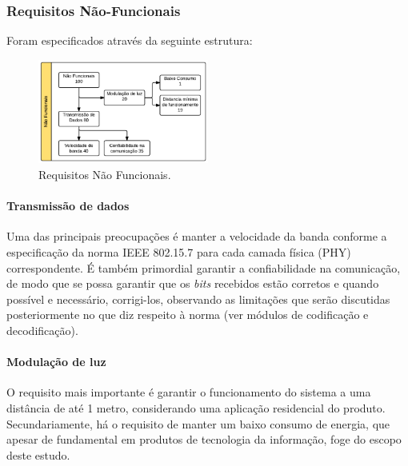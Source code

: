 	
	\subsubsection{Requisitos Não-Funcionais}\label{subsubsec-requisitos-nfunc}
	
	Foram especificados através da seguinte estrutura:
	
	\begin{figure}[h!]
		\caption{\label{fig_req2}Requisitos Não Funcionais.}
		\centering
		\includegraphics[width=0.5\textwidth]{Req_Tree_NFunc.pdf}
	\end{figure}

	\paragraph{Transmissão de dados} 
	Uma das principais preocupações é manter a velocidade da banda conforme a especificação da norma IEEE 802.15.7 para cada camada física (PHY) correspondente. É também primordial garantir a confiabilidade na comunicação, de modo que se possa garantir que os \textit{bits} recebidos estão corretos e quando possível e necessário, corrigi-los, observando as limitações que serão discutidas posteriormente no que diz respeito à norma (ver módulos de codificação e decodificação). 
	
	\paragraph{Modulação de luz} 
	O requisito mais importante é garantir o funcionamento do sistema a uma distância de até 1 metro, considerando uma aplicação residencial do produto. Secundariamente, há o requisito de manter um baixo consumo de energia, que apesar de fundamental em produtos de tecnologia da informação, foge do escopo deste estudo.
	
